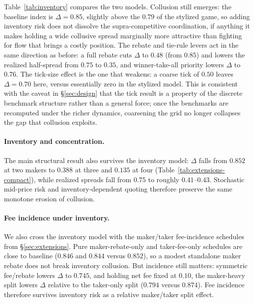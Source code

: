 \documentclass[sigconf]{acmart}
\begin{document}
Table~\ref{tab:inventory} compares the two models. Collusion still emerges: the baseline index is $\Delta = 0.85$, slightly above the $0.79$ of the stylized game, so adding inventory risk does not dissolve the supra-competitive coordination, if anything it makes holding a wide collusive spread marginally more attractive than fighting for flow that brings a costly position. The rebate and tie-rule levers act in the same direction as before: a full rebate cuts $\Delta$ to $0.48$ (from $0.85$) and lowers the realized half-spread from $0.75$ to $0.35$, and winner-take-all priority lowers $\Delta$ to $0.76$. The tick-size effect is the one that weakens: a coarse tick of $0.50$ leaves $\Delta = 0.70$ here, versus essentially zero in the stylized model. This is consistent with the caveat in \S\ref{sec:design} that the tick result is a property of the discrete benchmark structure rather than a general force; once the benchmarks are recomputed under the richer dynamics, coarsening the grid no longer collapses the gap that collusion exploits.



\paragraph{Inventory and concentration.} The main structural result also survives the inventory model: $\Delta$ falls from $0.852$ at two makers to $0.388$ at three and $0.135$ at four (Table~\ref{tab:extensions-compact}), while realized spreads fall from $0.75$ to roughly $0.41$--$0.43$. Stochastic mid-price risk and inventory-dependent quoting therefore preserve the same monotone erosion of collusion.

\paragraph{Fee incidence under inventory.} We also cross the inventory model with the maker/taker fee-incidence schedules from \S\ref{sec:extensions}. Pure maker-rebate-only and taker-fee-only schedules are close to baseline ($0.846$ and $0.844$ versus $0.852$), so a modest standalone maker rebate does not break inventory collusion. But incidence still matters: symmetric fee/rebate lowers $\Delta$ to $0.745$, and holding net fee fixed at $0.10$, the maker-heavy split lowers $\Delta$ relative to the taker-only split ($0.794$ versus $0.874$). Fee incidence therefore survives inventory risk as a relative maker/taker split effect.
\end{document}
